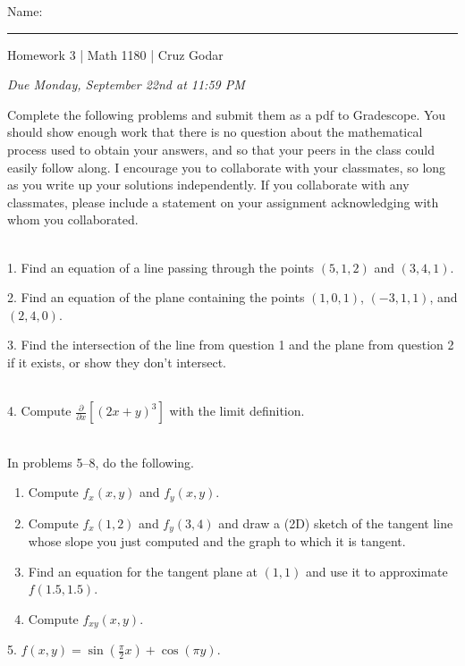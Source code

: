 \documentclass{article}
\begin{document}
\Large Name: \rule{2in}{0.15mm} \hfill Homework 3 | Math 1180 | Cruz Godar \vspace{4pt}  \normalsize

\textit{Due Monday, September 22nd at 11:59 PM}

Complete the following problems and submit them as a pdf to Gradescope. You should show enough work that there is no question about the mathematical process used to obtain your answers, and so that your peers in the class could easily follow along. I encourage you to collaborate with your classmates, so long as you write up your solutions independently. If you collaborate with any classmates, please include a statement on your assignment acknowledging with whom you collaborated.

~\\

1. Find an equation of a line passing through the points $(5, 1, 2)$ and $(3, 4, 1)$.

2. Find an equation of the plane containing the points $(1, 0, 1)$, $(-3, 1, 1)$, and $(2, 4, 0)$.

3. Find the intersection of the line from question 1 and the plane from question 2 if it exists, or show they don't intersect.

~\\

4. Compute $\frac{\partial }{\partial x} \left[ (2x + y)^3 \right]$ with the limit definition.

~\\

In problems 5--8, do the following.

\begin{enumerate}

	\item Compute $f_x(x, y)$ and $f_y(x, y)$.

	\item Compute $f_x(1, 2)$ and $f_y(3, 4)$ and draw a (2D) sketch of the tangent line whose slope you just computed and the graph to which it is tangent.

	\item Find an equation for the tangent plane at $(1, 1)$ and use it to approximate $f(1.5, 1.5)$.

	\item Compute $f_{xy}(x, y)$.

\end{enumerate}

5. $f(x, y) = \sin\left( \frac{\pi}{2} x \right) + \cos(\pi y)$.
\end{document}
